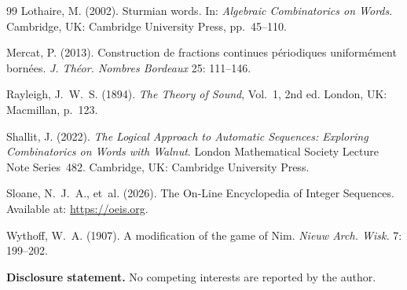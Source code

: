 \documentclass[11pt]{article}
\numberwithin{equation}{section}
\theoremstyle{plain}
\theoremstyle{definition}
\theoremstyle{remark}
\begin{document}
\begin{thebibliography}{99}
Lothaire, M. (2002).
Sturmian words.
In: \emph{Algebraic Combinatorics on Words}.
Cambridge, UK: Cambridge University Press, pp.~45--110.

Mercat, P. (2013).
Construction de fractions continues p\'eriodiques uniform\'ement born\'ees.
\emph{J. Th\'eor. Nombres Bordeaux} 25: 111--146.

Rayleigh, J.~W.~S. (1894).
\emph{The Theory of Sound}, Vol.~1, 2nd ed.
London, UK: Macmillan, p.~123.

Shallit, J. (2022).
\emph{The Logical Approach to Automatic Sequences:
Exploring Combinatorics on Words with Walnut}.
London Mathematical Society Lecture Note Series~482.
Cambridge, UK: Cambridge University Press.

Sloane, N.~J.~A., et~al. (2026).
The On-Line Encyclopedia of Integer Sequences.
Available at: \url{https://oeis.org}.

Wythoff, W.~A. (1907).
A modification of the game of {N}im.
\emph{Nieuw Arch. Wisk.} 7: 199--202.

\end{thebibliography}

\noindent\textbf{Disclosure statement.} No competing interests are reported by the author.
\end{document}
